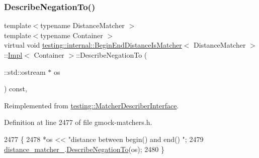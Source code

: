 \subsubsection{\texorpdfstring{Describe\+Negation\+To()}{DescribeNegationTo()}}
{\footnotesize\ttfamily template$<$typename Distance\+Matcher $>$ \\
template$<$typename Container $>$ \\
virtual void \hyperlink{classtesting_1_1internal_1_1BeginEndDistanceIsMatcher}{testing\+::internal\+::\+Begin\+End\+Distance\+Is\+Matcher}$<$ Distance\+Matcher $>$\+::\hyperlink{classtesting_1_1internal_1_1BeginEndDistanceIsMatcher_1_1Impl}{Impl}$<$ Container $>$\+::Describe\+Negation\+To (\begin{DoxyParamCaption}\item[{\+::std\+::ostream $\ast$}]{os }\end{DoxyParamCaption}) const\hspace{0.3cm}{\ttfamily [inline]}, {\ttfamily [virtual]}}



Reimplemented from \hyperlink{classtesting_1_1MatcherDescriberInterface_a2071afbc47097c4d1c0064275af34db0}{testing\+::\+Matcher\+Describer\+Interface}.



Definition at line 2477 of file gmock-\/matchers.\+h.


\begin{DoxyCode}
2477                                                           \{
2478       *os << \textcolor{stringliteral}{"distance between begin() and end() "};
2479       \hyperlink{classtesting_1_1internal_1_1BeginEndDistanceIsMatcher_1_1Impl_acc8d923e6901fa9c75bf76825b2baa6b}{distance\_matcher\_}.\hyperlink{classtesting_1_1internal_1_1MatcherBase_ac1089d49b6b8a381900618985cd69b7f}{DescribeNegationTo}(os);
2480     \}
\end{DoxyCode}
\mbox{\label{classtesting_1_1internal_1_1BeginEndDistanceIsMatcher_1_1Impl_a5ca27760e15a4f151cd0b964d724c6cf}} 
